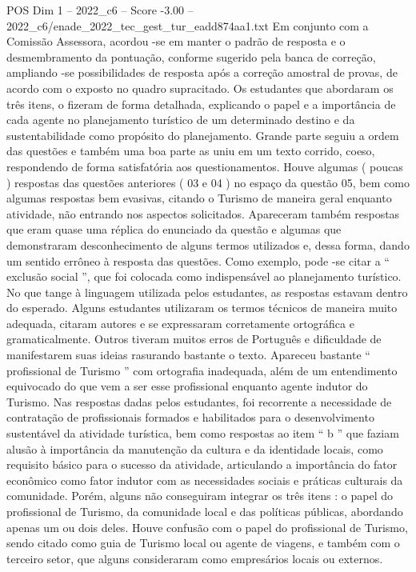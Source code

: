 \begin{textsample}{POS Dim 1 – 2022\_c6 – Score -3.00 – 2022\_c6/enade\_2022\_tec\_gest\_tur\_eadd874aa1.txt}
Em conjunto com a Comissão Assessora, acordou -se em manter o padrão de resposta e o desmembramento da pontuação, conforme sugerido pela banca de correção, ampliando -se possibilidades de resposta após a correção amostral de provas, de acordo com o exposto no quadro supracitado.
Os estudantes que abordaram os três itens, o fizeram de forma detalhada, explicando o papel e a importância de cada agente no planejamento turístico de um determinado destino e da sustentabilidade como propósito do planejamento.
Grande parte seguiu a ordem das questões e também uma boa parte as uniu em um texto corrido, coeso, respondendo de forma satisfatória aos questionamentos.
Houve algumas ( poucas ) respostas das questões anteriores ( 03 e 04 ) no espaço da questão 05, bem como algumas respostas bem evasivas, citando o Turismo de maneira geral enquanto atividade, não entrando nos aspectos solicitados.
Apareceram também respostas que eram quase uma réplica do enunciado da questão e algumas que demonstraram desconhecimento de alguns termos utilizados e, dessa forma, dando um sentido errôneo à resposta das questões.
Como exemplo, pode -se citar a “ exclusão social ”, que foi colocada como indispensável ao planejamento turístico.
No que tange à linguagem utilizada pelos estudantes, as respostas estavam dentro do esperado.
Alguns estudantes utilizaram os termos técnicos de maneira muito adequada, citaram autores e se expressaram corretamente ortográfica e gramaticalmente.
Outros tiveram muitos erros de Português e dificuldade de manifestarem suas ideias rasurando bastante o texto.
Apareceu bastante “ profissional de Turismo ” com ortografia inadequada, além de um entendimento equivocado do que vem a ser esse profissional enquanto agente indutor do Turismo.
Nas respostas dadas pelos estudantes, foi recorrente a necessidade de contratação de profissionais formados e habilitados para o desenvolvimento sustentável da atividade turística, bem como respostas ao item “ b ” que faziam alusão à importância da manutenção da cultura e da identidade locais, como requisito básico para o sucesso da atividade, articulando a importância do fator econômico como fator indutor com as necessidades sociais e práticas culturais da comunidade.
Porém, alguns não conseguiram integrar os três itens : o papel do profissional de Turismo, da comunidade local e das políticas públicas, abordando apenas um ou dois deles.
Houve confusão com o papel do profissional de Turismo, sendo citado como guia de Turismo local ou agente de viagens, e também com o terceiro setor, que alguns consideraram como empresários locais ou externos.

\end{textsample}
